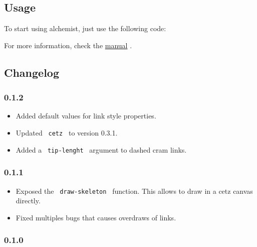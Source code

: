 \subsection{Usage}\label{usage}

To start using alchemist, just use the following code:

\begin{Shaded}
\begin{Highlighting}[]

\NormalTok{\})}
\end{Highlighting}
\end{Shaded}

For more information, check the
\href{https://raw.githubusercontent.com/Robotechnic/alchemist/master/doc/manual.pdf}{manual}
.

\subsection{Changelog}\label{changelog}

\subsubsection{0.1.2}\label{section}

\begin{itemize}
\tightlist
\item
  Added default values for link style properties.
\item
  Updated \texttt{\ cetz\ } to version 0.3.1.
\item
  Added a \texttt{\ tip-lenght\ } argument to dashed cram links.
\end{itemize}

\subsubsection{0.1.1}\label{section-1}

\begin{itemize}
\tightlist
\item
  Exposed the \texttt{\ draw-skeleton\ } function. This allows to draw
  in a cetz canvas directly.
\item
  Fixed multiples bugs that causes overdraws of links.
\end{itemize}

\subsubsection{0.1.0}\label{section-2}

